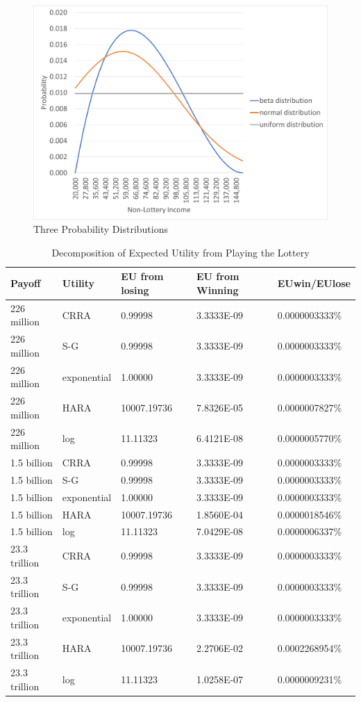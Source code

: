 \documentclass[letterpaper,12pt]{article}
\numberwithin{equation}{section}
\numberwithin{figure}{section}
\numberwithin{table}{section}
\begin{document}
\begin{spacing}{1.5}
	\begin{figure}[ht] 
		\centering
		\caption{Three Probability Distributions}
		\label{fig_PDFs}
		\includegraphics[width=.9\textwidth]{images/PDFs.png}
	\end{figure}


	\begin{table}[ht] 
		\caption{Decomposition of Expected Utility from Playing the Lottery}
		\label{tab_lottery2}
		\centering
		\small
		\begin{tabular}{|ll|lll|}
			\hline
			Payoff & Utility & EU from losing  & EU from Winning & EUwin/EUlose \\
			\hline
			226 million & CRRA & 0.99998 & 3.3333E-09 & 0.0000003333\% \\
			226 million & S-G & 0.99998 & 3.3333E-09 & 0.0000003333\% \\
			226 million & exponential & 1.00000 & 3.3333E-09 & 0.0000003333\% \\
			226 million & HARA & 10007.19736 & 7.8326E-05 & 0.0000007827\% \\
			226 million & log & 11.11323 & 6.4121E-08 & 0.0000005770\% \\
			1.5 billion & CRRA & 0.99998 & 3.3333E-09 & 0.0000003333\% \\
			1.5 billion & S-G & 0.99998 & 3.3333E-09 & 0.0000003333\% \\
			1.5 billion & exponential & 1.00000 & 3.3333E-09 & 0.0000003333\% \\
			1.5 billion & HARA & 10007.19736 & 1.8560E-04 & 0.0000018546\% \\
			1.5 billion & log & 11.11323 & 7.0429E-08 & 0.0000006337\% \\
			23.3 trillion & CRRA & 0.99998 & 3.3333E-09 & 0.0000003333\% \\
			23.3 trillion & S-G & 0.99998 & 3.3333E-09 & 0.0000003333\% \\
			23.3 trillion & exponential & 1.00000 & 3.3333E-09 & 0.0000003333\% \\
			23.3 trillion & HARA & 10007.19736 & 2.2706E-02 & 0.0002268954\% \\
			23.3 trillion & log & 11.11323 & 1.0258E-07 & 0.0000009231\% \\
			\hline
		\end{tabular}
	\end{table}



\end{spacing}
\end{document}
